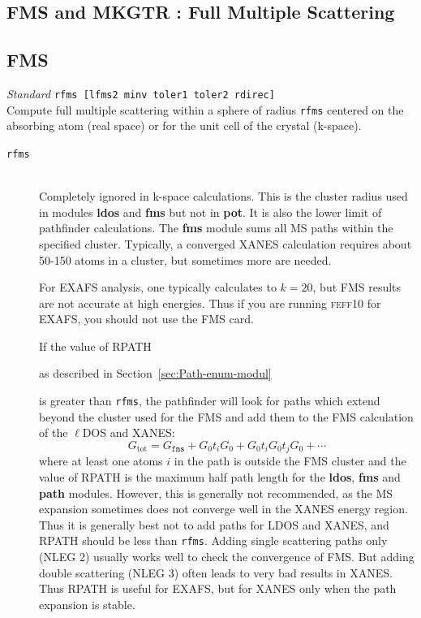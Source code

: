 \documentclass[11pt,oneside]{report} %
\renewcommand{\htmlref}[2]{\hyperlink{#2}{#1}}
\newcommand{\program}[1]{\textsc{#1}}
\newcommand{\feff}{\program{feff}}
\newcommand{\vnum}{10}
\newcommand{\feffcur}{\feff\vnum}
\newenvironment{Card}[4]%
      {\vspace{3ex}%
        \subsection{#1}
        \quad\textsl{#3}\newline
        \quad\texttt{#2}\newline%
        \label{card:#4}\\}
      {}
\newcommand{\module}[1]{\textrm{\bf{#1}}}
\renewcommand{\htmlref}[2]{{#1}} %
\begin{document}
  \subsection{FMS and MKGTR : Full Multiple Scattering}

\label{sec:Full-mult-scatt}


\begin{Card}{FMS}{rfms  [lfms2 minv toler1 toler2 rdirec]}{Standard}{fms}
  Compute full multiple scattering within a sphere of radius
  \texttt{rfms} centered on the absorbing atom (real space) or for the unit cell of the crystal (k-space).
\begin{description}
  \item[\texttt{rfms}]\hfill\\ Completely ignored in k-space calculations.  This is the cluster radius used in modules 
  \module{ldos} and \module{fms} but not in \module{pot}. It is also the lower 
  limit of pathfinder calculations. The \module{fms} module sums all MS paths within 
  the specified cluster. Typically, a converged XANES calculation requires
  about 50-150 atoms in a cluster, but sometimes more are needed.

  For EXAFS analysis, one typically calculates to $k=20$, but FMS results
  are not accurate at high energies. Thus if you are running
  {\feffcur} for EXAFS, you should not use the FMS card.

  If the value of \htmlref{RPATH}{card:rpa} 
  \begin{latexonly}
    as described in Section~\ref{sec:Path-enum-modul}
  \end{latexonly} 
  is greater than \texttt{rfms}, the
  pathfinder will look for paths which extend beyond the cluster used
  for the FMS and add them to the FMS calculation of the $\ell$DOS and
  XANES:
  $$G_{\mathrm{tot}}=G_{\mathtt{fms}} + G_0t_iG_0 +
  G_0t_iG_0t_jG_0+\cdots$$
  where at least one atoms $i$ in the path is outside the FMS cluster
  and the value of RPATH is the maximum half path length for the \module{ldos},
  \module{fms} and \module{path} modules. However, this is generally not recommended,
  as the MS expansion sometimes does not converge well in the XANES energy
  region. Thus it is generally best not to add paths for LDOS and XANES, and
  RPATH should be less than \texttt{rfms}. Adding single scattering
  paths only (NLEG 2) usually works well to check the convergence of
  FMS. But adding double scattering (NLEG 3) often leads to very bad
  results in XANES. Thus RPATH is useful for EXAFS, but for XANES only
  when the path expansion is stable.


\end{description}
\end{Card}
\end{document}
